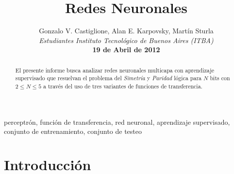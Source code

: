 \documentclass[%
    final,
    reprint,
    notitlepage,
    narroweqnarray,
    inline,
    twoside,
    invited
    ]{ieee}
\begin{document}
\title[Redes Neuronales]{%
       Redes Neuronales}

\author[Castiglione, Karpovsky, Sturla]{Gonzalo V. Castiglione, Alan E. Karpovsky, Martín Sturla\\\textit{Estudiantes 
       Instituto Tecnológico de Buenos Aires (ITBA)}\\
\textbf{19 de Abril de 2012}
}


\lognumber{}
\pubitemident{}


\maketitle               

\begin{abstract} 
El presente informe busca analizar  redes neuronales multicapa
con aprendizaje supervisado que resuelvan el problema del \textit{Simetría} y \textit{Paridad} lógica para $N$ bits 
con $2 \le N \le 5$ a través del uso de tres variantes de funciones de transferencia.

\end{abstract}

\begin{keywords}
perceptrón, función de transferencia, red neuronal, aprendizaje supervisado, conjunto de entrenamiento, conjunto de testeo
\end{keywords}

\section{Introducción}
\end{document}
